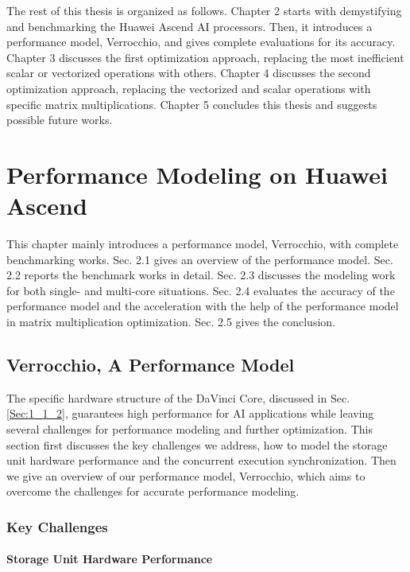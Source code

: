 \documentclass[12pt]{extbook}
\begin{document}
The rest of this thesis is organized as follows. Chapter 2 starts with demystifying and benchmarking the Huawei Ascend AI processors. Then, it introduces a performance model, Verrocchio, and gives complete evaluations for its accuracy. Chapter 3 discusses the first optimization approach, replacing the most inefficient scalar or vectorized operations with others. Chapter 4 discusses the second optimization approach, replacing the vectorized and scalar operations with specific matrix multiplications. Chapter 5 concludes this thesis and suggests possible future works.


\chapter{Performance Modeling on Huawei Ascend}
\label{sec_2}

This chapter mainly introduces a performance model, Verrocchio, with complete benchmarking works. Sec. 2.1 gives an overview of the performance model. Sec. 2.2 reports the benchmark works in detail. Sec. 2.3 discusses the modeling work for both single- and multi-core situations. Sec. 2.4 evaluates the accuracy of the performance model and the acceleration with the help of the performance model in matrix multiplication optimization. Sec. 2.5 gives the conclusion.

\section{Verrocchio, A Performance Model}
\label{sec_2_1}

The specific hardware structure of the DaVinci Core, discussed in Sec. \ref{Sec:1_1_2}, guarantees high performance for AI applications while leaving several challenges for performance modeling and further optimization. This section first discusses the key challenges we address, how to model the storage unit hardware performance and the concurrent execution synchronization. Then we give an overview of our performance model, Verrocchio, which aims to overcome the challenges for accurate performance modeling.

\subsection{Key Challenges}

\subsubsection{Storage Unit Hardware Performance}
\end{document}
